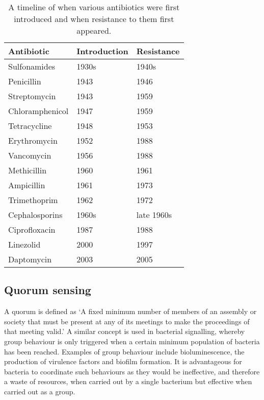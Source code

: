 \begin{table}[H]
  \centering
\begin{tabular}{|p{}|p{}|p{}|}
\hline  
\textbf{Antibiotic} & \textbf{Introduction} & \textbf{Resistance} \\ 
\hline
Sulfonamides & 1930s & 1940s \\ 
\hline 
Penicillin & 1943 & 1946 \\ 
\hline 
Streptomycin & 1943 & 1959 \\ 
\hline 
Chloramphenicol & 1947 & 1959 \\ 
\hline 
Tetracycline & 1948 & 1953 \\ 
\hline 
Erythromycin & 1952 & 1988 \\ 
\hline 
Vancomycin & 1956 & 1988 \\ 
\hline 
Methicillin & 1960 & 1961 \\ 
\hline 
Ampicillin & 1961 & 1973 \\ 
\hline 
Trimethoprim & 1962 & 1972 \\
\hline 
Cephalosporins & 1960s & late 1960s \\
\hline 
Ciprofloxacin & 1987 & 1988 \\
\hline 
Linezolid & 2000 & 1997 \\
\hline
Daptomycin & 2003 & 2005\\
\hline
\end{tabular}
\caption{A timeline of when various antibiotics were first introduced and when resistance to them first appeared\cite{Clatworthy2007,Palumbi2001,Ogle1988,Huovinen2001,Birmingham2003,Lee2007}.\label{tbl:AB_timeline}} 
\end{table}


\subsection{Quorum sensing}

A quorum is defined as `A fixed minimum number of members of an assembly or society that must be present at any of its meetings to make the proceedings of that meeting valid.' \cite{Dictionary}  
A similar concept is used in bacterial signalling, whereby group behaviour is only triggered when a certain minimum population of bacteria has been reached. Examples of group behaviour include bioluminescence, the  production of  virulence factors and biofilm formation.  
It is advantageous for bacteria to coordinate such behaviours as they would be ineffective, and therefore a waste of resources, when carried out by a single bacterium but effective when carried out as a group.

